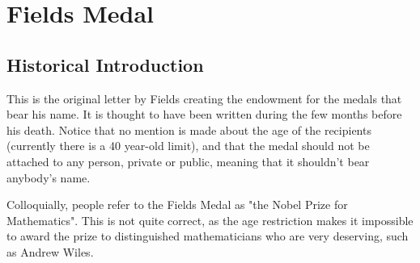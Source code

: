 
\section{Fields Medal}

\subsection{Historical Introduction}

This is the original letter by Fields creating the endowment for the
medals that bear his name.
It is thought to have been written during the few months before his death.
Notice that no mention is made about the age of the recipients
(currently there is a 40 year-old limit), and that the medal should
not be attached to any person, private or public, meaning that it
shouldn't bear anybody's name.

Colloquially, people refer to the Fields Medal as "the Nobel Prize for
Mathematics". This is not quite correct, as the age restriction 
makes it impossible to award the prize to distinguished mathematicians
who are very deserving, such as Andrew Wiles. 

